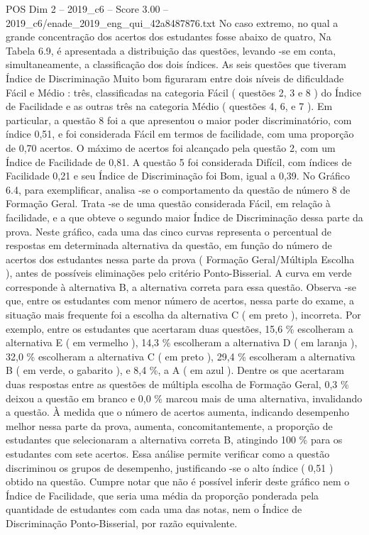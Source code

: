 \begin{textsample}{POS Dim 2 – 2019\_c6 – Score 3.00 – 2019\_c6/enade\_2019\_eng\_qui\_42a8487876.txt}
No caso extremo, no qual a grande concentração dos acertos dos estudantes fosse abaixo de quatro, Na Tabela 6.9, é apresentada a distribuição das questões, levando -se em conta, simultaneamente, a classificação dos dois índices.
As seis questões que tiveram Índice de Discriminação Muito bom figuraram entre dois níveis de dificuldade Fácil e Médio : três, classificadas na categoria Fácil ( questões 2, 3 e 8 ) do Índice de Facilidade e as outras três na categoria Médio ( questões 4, 6, e 7 ).
Em particular, a questão 8 foi a que apresentou o maior poder discriminatório, com índice 0,51, e foi considerada Fácil em termos de facilidade, com uma proporção de 0,70 acertos.
O máximo de acertos foi alcançado pela questão 2, com um Índice de Facilidade de 0,81.
A questão 5 foi considerada Difícil, com índices de Facilidade 0,21 e seu Índice de Discriminação foi Bom, igual a 0,39.
No Gráfico 6.4, para exemplificar, analisa -se o comportamento da questão de número 8 de Formação Geral.
Trata -se de uma questão considerada Fácil, em relação à facilidade, e a que obteve o segundo maior Índice de Discriminação dessa parte da prova.
Neste gráfico, cada uma das cinco curvas representa o percentual de respostas em determinada alternativa da questão, em função do número de acertos dos estudantes nessa parte da prova ( Formação Geral/Múltipla Escolha ), antes de possíveis eliminações pelo critério Ponto-Bisserial.
A curva em verde corresponde à alternativa B, a alternativa correta para essa questão.
Observa -se que, entre os estudantes com menor número de acertos, nessa parte do exame, a situação mais frequente foi a escolha da alternativa C ( em preto ), incorreta.
Por exemplo, entre os estudantes que acertaram duas questões, 15,6 \% escolheram a alternativa E ( em vermelho ), 14,3 \% escolheram a alternativa D ( em laranja ), 32,0 \% escolheram a alternativa C ( em preto ), 29,4 \% escolheram a alternativa B ( em verde, o gabarito ), e 8,4 \%, a A ( em azul ).
Dentre os que acertaram duas respostas entre as questões de múltipla escolha de Formação Geral, 0,3 \% deixou a questão em branco e 0,0 \% marcou mais de uma alternativa, invalidando a questão.
À medida que o número de acertos aumenta, indicando desempenho melhor nessa parte da prova, aumenta, concomitantemente, a proporção de estudantes que selecionaram a alternativa correta B, atingindo 100 \% para os estudantes com sete acertos.
Essa análise permite verificar como a questão discriminou os grupos de desempenho, justificando -se o alto índice ( 0,51 ) obtido na questão.
Cumpre notar que não é possível inferir deste gráfico nem o Índice de Facilidade, que seria uma média da proporção ponderada pela quantidade de estudantes com cada uma das notas, nem o Índice de Discriminação Ponto-Bisserial, por razão equivalente.

\end{textsample}
